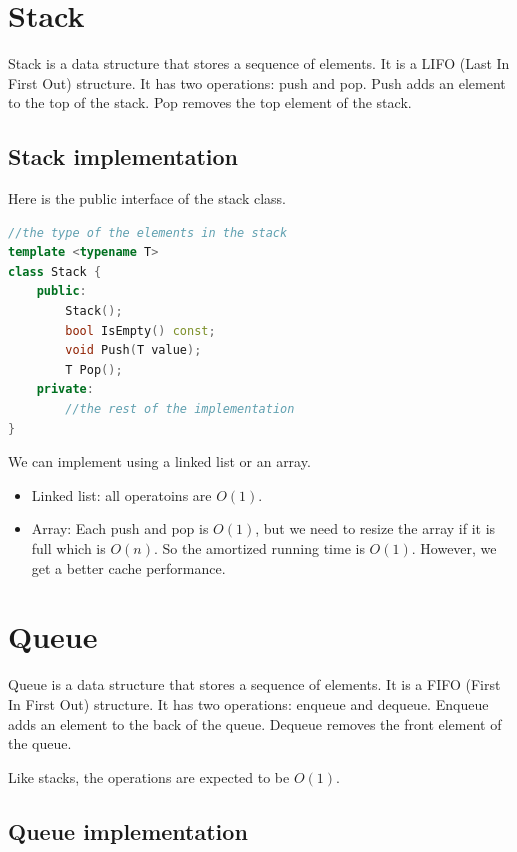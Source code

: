 \documentclass[letterpaper,12pt]{article}
\begin{document}
\section{Stack}
Stack is a data structure that stores a sequence of elements. It is a LIFO (Last In First Out) structure. It has two operations: push and pop. Push adds an element to the top of the stack. Pop removes the top element of the stack.

\subsection{Stack implementation}
Here is the public interface of the stack class.
\begin{lstlisting}[language=C++]
//the type of the elements in the stack
template <typename T>
class Stack {
    public:
        Stack();
        bool IsEmpty() const;
        void Push(T value); 
        T Pop();
    private:
        //the rest of the implementation
}
\end{lstlisting}
We can implement using a linked list or an array.\begin{itemize}
    \item Linked list: all operatoins are $O(1)$.
    \item Array: Each push and pop is $O(1)$, but we need to resize the array if it is full which is $O(n)$. So the amortized running time is $O(1)$. However, we get a better cache performance.
\end{itemize}


\section{Queue}
Queue is a data structure that stores a sequence of elements. It is a FIFO (First In First Out) structure. It has two operations: enqueue and dequeue. Enqueue adds an element to the back of the queue. Dequeue removes the front element of the queue.

Like stacks, the operations are expected to be $O(1)$.
\subsection{Queue implementation}
\end{document}
